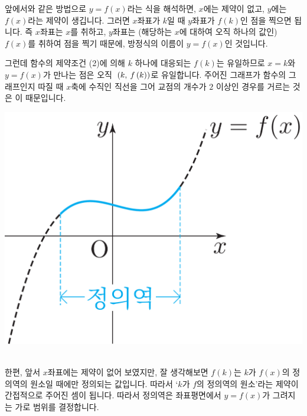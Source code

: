 	
	앞에서와 같은 방법으로 $y=f\left( x \right) $라는 식을 해석하면, $x$에는 제약이 없고, $y$에는 $f\left( x \right) $라는 제약이 생깁니다. 그러면 $x$좌표가 $k$일 때 $y$좌표가 $f\left( k \right) $인 점을 찍으면 됩니다.  즉 $x$좌표는 $x$를 취하고, $y$좌표는 (해당하는 $x$에 대하여 오직 하나의 값인) $f\left( x \right) $를 취하여 점을 찍기 때문에, 방정식의 이름이 $y = f\left( x \right) $인 것입니다.

그런데 함수의 제약조건 (2)에 의해 $k$ 하나에 대응되는 $f\left( k \right) $는 유일하므로 $x=k$와 $y=f\left( x \right) $가 만나는 점은 오직 $\mathrm{}\left(k,\:f\left( k \right) \right)$로 유일합니다. 주어진 그래프가 함수의 그래프인지 따질 때 $x$축에 수직인 직선을 그어 교점의 개수가 $2$ 이상인 경우를 거르는 것은 이 때문입니다.
\begin{center} \includegraphics[scale=\pgfkeysvalueof{picsize}]{DBs/pic/zery_05.pdf}\
	\end{center}한편, 앞서 $x$좌표에는 제약이 없어 보였지만, 잘 생각해보면 $f\left( k \right) $는 $k$가 $f\left( x \right) $의 정의역의 원소일 때에만 정의되는 값입니다. 따라서 `$k$가 $f$의 정의역의 원소'라는 제약이 간접적으로 주어진 셈이 됩니다. 따라서 정의역은 좌표평면에서 $y=f\left( x \right) $가 그려지는 가로 범위를 결정합니다.
\clearpage

